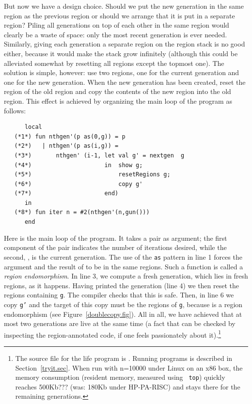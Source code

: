 \documentclass[12pt]{book}
\begin{document}
But now we have a design choice. Should we put the new generation in
the same region as the previous region or should we arrange that it is
put in a separate region? Piling all generations on top of each other
in the same region would clearly be a waste of space: only the most
recent generation is ever needed. Similarly, giving each generation a
separate region on the region stack is no good either, because it
would make the stack grow infinitely (although this could be
alleviated somewhat by resetting all regions except the topmost one).
The solution is simple, however: use two regions, one for the current
generation and one for the new generation. When the new generation has
been created, reset the region of the old region and copy the contents
of the new region into the old region. This effect is achieved by
organizing the main loop of the program as follows:
\begin{verbatim}
      local 
   (*1*) fun nthgen'(p as(0,g)) = p 
   (*2*)   | nthgen'(p as(i,g)) = 
   (*3*)       nthgen' (i-1, let val g' = nextgen  g
   (*4*)                     in  show g;
   (*5*)                         resetRegions g;
   (*6*)                         copy g'
   (*7*)                     end)
      in 
   (*8*) fun iter n = #2(nthgen'(n,gun()))
      end
\end{verbatim}
Here  
%
is the main loop of the program. It takes a pair as argument; the
first component of the pair indicates the number of iterations
desired, while the second, , is the current generation. The
use of the {\tt as} pattern in line 1 forces the argument and the
result of  to be in the same regions. Such a function
is called a
%
{\em region endomorphism}. In line 3, we compute a fresh generation,
which lies in fresh regions, as it happens. Having printed the
generation (line 4) we then reset the regions containing {\tt g}. The
compiler checks that this is safe. Then, in line 6 we copy {\tt g'}
and the target of this copy must be the regions of {\tt g}, because
 is a region endomorphism (see
Figure~\ref{doublecopy.fig}).  All in all, we have achieved that at
most two generations are live at the same time (a fact that can be
checked by inspecting the region-annotated code, if one feels
passionately about it).\footnote{The source file for the life program
  is . Running programs is described in
  Section~\ref{tryit.sec}. When run with n=10000 under Linux on an x86
  box, the memory consumption (resident memory, measured using {\tt
    top}) quickly reaches 500Kb??? (was: 180Kb under HP-PA-RISC) and
  stays there for the remaining generations.}
\end{document}
